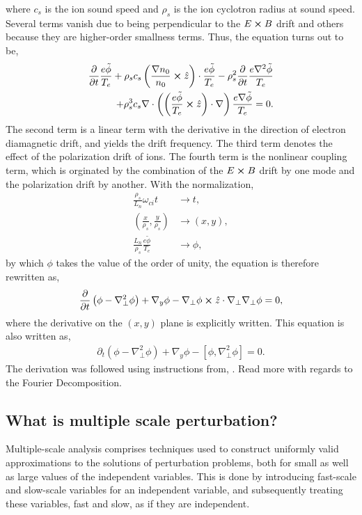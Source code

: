 where $c_s$ is the ion sound speed and $\rho_s$ is the ion cyclotron radius at sound speed. Several terms vanish due to being perpendicular to the $E \cross B$ drift and others because they are higher-order smallness terms. Thus, the equation turns out to be, 
\begin{align}
\begin{split}
	\frac{\partial}{\partial t} \frac{e \tilde{\phi}}{T_e} + \rho_s c_s \left(\frac{\nabla n_0}{n_0} \cross \hat{z} \right) \cdot \frac{e \tilde{\phi}}{T_e} - \rho_s^2 \frac{\partial}{\partial t} \frac{e \nabla^2 \tilde{\phi}}{T_e} \\
	+ \rho_s^3 c_s \nabla \cdot \left( \left(\frac{e \tilde{\phi}}{T_e} \cross \hat{z} \right) \cdot \nabla \right) \frac{e \nabla \tilde{\phi}}{T_e} = 0.
\end{split}
\end{align} 
The second term is a linear term with the derivative in the direction of electron diamagnetic drift, and yields the drift frequency. The third term denotes the effect of the polarization drift of ions. The fourth term is the nonlinear coupling term, which is orginated by the combination of the $E \cross B$ drift by one mode and the polarization drift by another. With the normalization, 
\begin{align}
	\frac{\rho_s}{L_n} \omega_{ci} t &\rightarrow t, \\
	\left(\frac{x}{\rho_s}, \frac{y}{\rho_s} \right) &\rightarrow (x,y), \\
	\frac{L_n}{\rho_s} \frac{e \tilde{\phi}}{T_e} &\rightarrow \phi, 
\end{align}
by which $\phi$ takes the value of the order of unity, the equation is therefore rewritten as, 
\begin{align}
	\frac{\partial}{\partial t} \left(\phi - \nabla_{\perp}^2 \phi \right) + \nabla_y \phi - \nabla_{\perp} \phi \cross \hat{z} \cdot \nabla_{\perp} \nabla_{\perp} \phi = 0,
\end{align}
where the derivative on the $(x,y)$ plane is explicitly written. This equation is also written as, 
\begin{align}
	\partial_t \left(\phi - \nabla_{\perp}^2 \phi \right) + \nabla_y \phi - \left[\phi, \nabla_{\perp}^2 \phi \right] = 0.
\end{align}
The derivation was followed using instructions from, \cite{diamond_itoh_itoh_2010}. Read more with regards to the Fourier Decomposition. 


\subsection{What is multiple scale perturbation?}
Multiple-scale analysis comprises techniques used to construct uniformly valid approximations to the solutions of perturbation problems, both for small as well as large values of the independent variables. This is done by introducing fast-scale and slow-scale variables for an independent variable, and subsequently treating these variables, fast and slow, as if they are independent.

